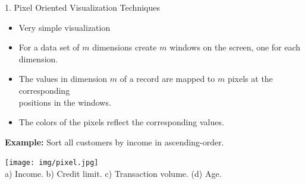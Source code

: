\begin{frame}{1. Pixel Oriented Visualization Techniques}
	\vspace*{-0.5em}

	\begin{itemize}
		\item Very simple visualization
		\item For a data set of $m$ dimensions create $m$ windows on the screen, one for each dimension.
		\item The values in dimension $m$ of a record are mapped to $m$ pixels at the corresponding \\ positions in the windows.
		\item The colors of the pixels reflect the corresponding values.
	\end{itemize}

	\vspace*{0.5em}
	\textbf{Example:} Sort all customers by income in ascending-order.

	\begin{center}
		\texttt{[image: img/pixel.jpg]}\\
		\vspace*{-0.5em}
		a) Income. \hspace{0.3cm} b) Credit limit. \hspace{0.1cm} c) Transaction volume. \hspace{0.2cm} (d) Age.
	\end{center}

\end{frame}


